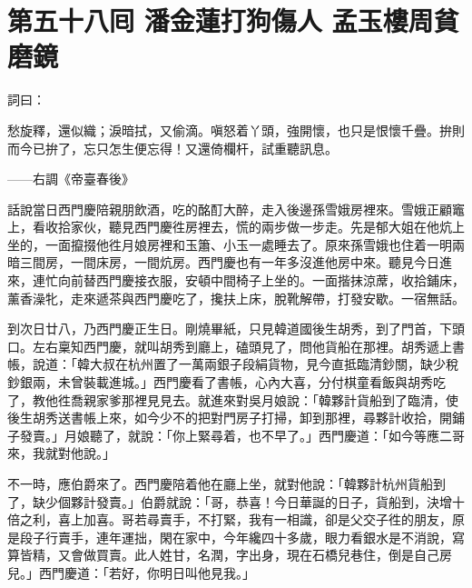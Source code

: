 
\chapter*{第五十八囘 潘金蓮打狗傷人 孟玉樓周貧磨鏡}


詞曰：

愁旋釋，還似織；淚暗拭，又偷滴。嗔怒着丫頭，強開懷，也只是恨懷千疊。拚則而今已拚了，忘只怎生便忘得！又還倚欄杆，試重聽訊息。

——右調《帝臺春後》

話說當日西門慶陪親朋飲酒，吃的酩酊大醉，走入後邊孫雪娥房裡來。雪娥正顧竈上，看收拾家伙，聽見西門慶徃房裡去，慌的兩步做一步走。{}先是郁大姐在他炕上坐的，一面攛掇他徃月娘房裡和玉簫、小玉一處睡去了。原來孫雪娥也住着一明兩暗三間房，一間床房，一間炕房。西門慶也有一年多沒進他房中來。聽見今日進來，連忙向前替西門慶接衣服，安頓中間椅子上坐的。一面揩抹涼蓆，收拾鋪床，薰香澡牝，走來遞茶與西門慶吃了，攙扶上床，脫靴解帶，打發安歇。一宿無話。

到次日廿八，乃西門慶正生日。剛燒畢紙，只見韓道國後生胡秀，到了門首，下頭口。左右稟知西門慶，就叫胡秀到廳上，磕頭見了，問他貨船在那裡。胡秀遞上書帳，說道：「韓大叔在杭州置了一萬兩銀子段絹貨物，見今直抵臨清鈔關，缺少稅鈔銀兩，未曾裝載進城。」西門慶看了書帳，心內大喜，分付棋童看飯與胡秀吃了，教他徃喬親家爹那裡見見去。就進來對吳月娘說：「韓夥計貨船到了臨清，使後生胡秀送書帳上來，如今少不的把對門房子打掃，卸到那裡，尋夥計收拾，開鋪子發賣。」月娘聽了，就說：「你上緊尋着，也不早了。」西門慶道：「如今等應二哥來，我就對他說。」

不一時，應伯爵來了。西門慶陪着他在廳上坐，就對他說：「韓夥計杭州貨船到了，缺少個夥計發賣。」伯爵就說：「哥，恭喜！今日華誕的日子，貨船到，決增十倍之利，喜上加喜。{}哥若尋賣手，不打緊，我有一相識，卻是父交子徃的朋友，原是段子行賣手，連年運拙，閑在家中，今年纔四十多歲，眼力看銀水是不消說，寫算皆精，又會做買賣。此人姓甘，名潤，字出身，現在石橋兒巷住，倒是自己房兒。」西門慶道：「若好，你明日叫他見我。」

